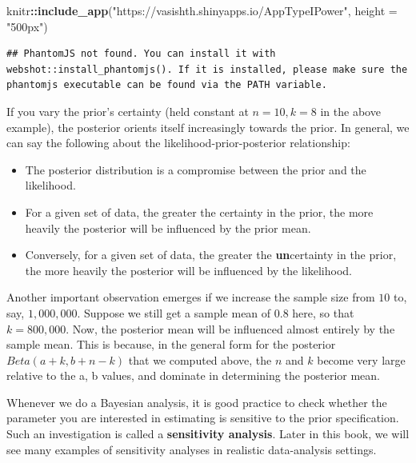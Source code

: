 \documentclass[12pt,]{krantz}
\newenvironment{Shaded}{\begin{snugshade}}{\end{snugshade}}
\newcommand{\DataTypeTok}[1]{\textcolor[rgb]{0.13,0.29,0.53}{#1}}
\newcommand{\KeywordTok}[1]{\textcolor[rgb]{0.13,0.29,0.53}{\textbf{#1}}}
\newcommand{\NormalTok}[1]{#1}
\newcommand{\OperatorTok}[1]{\textcolor[rgb]{0.81,0.36,0.00}{\textbf{#1}}}
\newcommand{\StringTok}[1]{\textcolor[rgb]{0.31,0.60,0.02}{#1}}
\providecommand{\tightlist}{%
  \setlength{\itemsep}{0pt}\setlength{\parskip}{0pt}}
\theoremstyle{definition}
\theoremstyle{definition}
\theoremstyle{definition}
\theoremstyle{remark}
\begin{document}
\begin{Shaded}
\begin{Highlighting}[]
\NormalTok{knitr}\OperatorTok{::}\KeywordTok{include_app}\NormalTok{(}\StringTok{"https://vasishth.shinyapps.io/AppTypeIPower"}\NormalTok{, }
  \DataTypeTok{height =} \StringTok{"500px"}\NormalTok{)}
\end{Highlighting}
\end{Shaded}

\begin{verbatim}
## PhantomJS not found. You can install it with webshot::install_phantomjs(). If it is installed, please make sure the phantomjs executable can be found via the PATH variable.
\end{verbatim}

If you vary the prior's certainty (held constant at \(n=10, k=8\) in the above example), the posterior orients itself increasingly towards the prior. In general, we can say the following about the likelihood-prior-posterior relationship:

\begin{itemize}
\tightlist
\item
  The posterior distribution is a compromise between the prior and the likelihood.
\item
  For a given set of data, the greater the certainty in the prior, the more heavily the posterior will be influenced by the prior mean.
\item
  Conversely, for a given set of data, the greater the \textbf{un}certainty in the prior, the more heavily the posterior will be influenced by the likelihood.
\end{itemize}

Another important observation emerges if we increase the sample size from \(10\) to, say, \(1,000,000\). Suppose we still get a sample mean of \(0.8\) here, so that \(k=800,000\). Now, the posterior mean will be influenced almost entirely by the sample mean. This is because, in the general form for the posterior \(Beta(a+k,b+n-k)\) that we computed above, the \(n\) and \(k\) become very large relative to the a, b values, and dominate in determining the posterior mean.

Whenever we do a Bayesian analysis, it is good practice to check whether the parameter you are interested in estimating is sensitive to the prior specification. Such an investigation is called a \textbf{sensitivity analysis}. Later in this book, we will see many examples of sensitivity analyses in realistic data-analysis settings.
\end{document}
